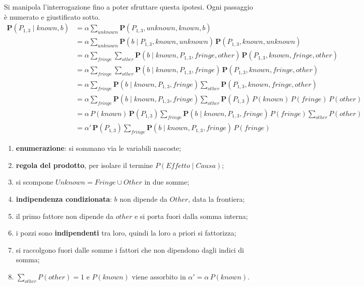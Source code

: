 \documentclass[11pt, a4paper]{article}
\newcommand{\Pv}{\mathbf{P}}               %
\newcommand{\known}{\mathit{known}}
\newcommand{\fringe}{\mathit{fringe}}
\newcommand{\other}{\mathit{other}}
\newcommand{\unknown}{\mathit{unknown}}
\begin{document}
Si manipola l'interrogazione fino a poter sfruttare questa ipotesi. Ogni passaggio è numerato e giustificato sotto.
{\small
\begin{align}
  \Pv(P_{1,3} \mid \known, b)
  &= \alpha \sum_{\unknown} \Pv(P_{1,3}, \unknown, \known, b) \\
  &= \alpha \sum_{\unknown} \Pv(b \mid P_{1,3}, \known, \unknown)\, \Pv(P_{1,3}, \known, \unknown) \\
  &= \alpha \sum_{\fringe} \sum_{\other} \Pv(b \mid \known, P_{1,3}, \fringe, \other)\, \Pv(P_{1,3}, \known, \fringe, \other) \\
  &= \alpha \sum_{\fringe} \sum_{\other} \Pv(b \mid \known, P_{1,3}, \fringe)\, \Pv(P_{1,3}, \known, \fringe, \other) \\
  &= \alpha \sum_{\fringe} \Pv(b \mid \known, P_{1,3}, \fringe) \sum_{\other} \Pv(P_{1,3}, \known, \fringe, \other) \\
  &= \alpha \sum_{\fringe} \Pv(b \mid \known, P_{1,3}, \fringe) \sum_{\other} \Pv(P_{1,3})\,P(\known)\,P(\fringe)\,P(\other) \\
  &= \alpha\, P(\known)\,\Pv(P_{1,3}) \sum_{\fringe} \Pv(b \mid \known, P_{1,3}, \fringe)\,P(\fringe) \sum_{\other} P(\other) \\
  &= \alpha'\, \Pv(P_{1,3}) \sum_{\fringe} \Pv(b \mid \known, P_{1,3}, \fringe)\,P(\fringe)
\end{align}
}

\begin{enumerate}
  \item \textbf{enumerazione}: si sommano via le variabili nascoste;
  \item \textbf{regola del prodotto}, per isolare il termine $P(\mathit{Effetto} \mid \mathit{Causa})$;
  \item si scompone $\mathit{Unknown} = \mathit{Fringe} \cup \mathit{Other}$ in due somme;
  \item \textbf{indipendenza condizionata}: $b$ non dipende da $\mathit{Other}$, data la frontiera;
  \item il primo fattore non dipende da $\other$ e si porta fuori dalla somma interna;
  \item i pozzi sono \textbf{indipendenti} tra loro, quindi la loro a priori si fattorizza;
  \item si raccolgono fuori dalle somme i fattori che non dipendono dagli indici di somma;
  \item $\sum_{\other} P(\other) = 1$ e $P(\known)$ viene assorbito in $\alpha' = \alpha\,P(\known)$.
\end{enumerate}
\end{document}
